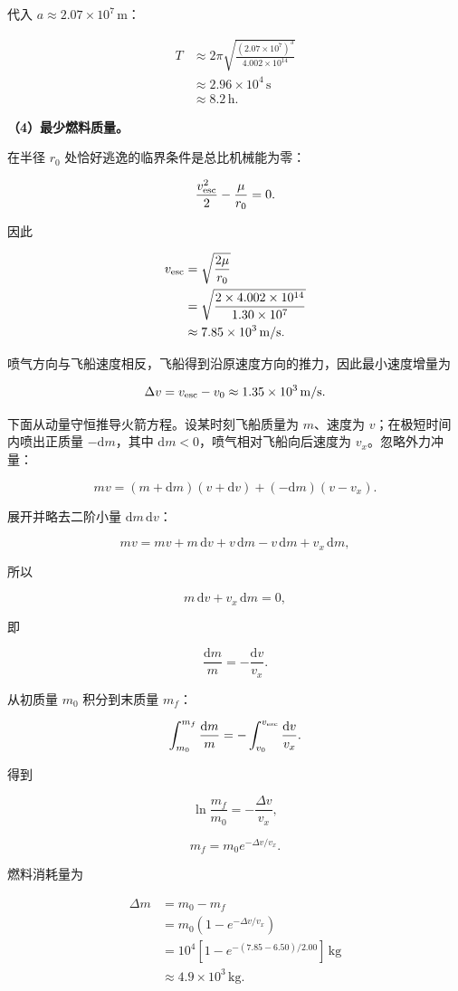 \documentclass[12pt,a4paper,UTF8]{ctexart}
\begin{document}
代入 \(a\approx2.07\times10^7\,\mathrm m\)：

\[
\begin{aligned}
T&\approx2\pi\sqrt{\frac{(2.07\times10^7)^3}{4.002\times10^{14}}}\\
&\approx2.96\times10^4\,\mathrm s\\
&\approx\boxed{8.2\,\mathrm h}.
\end{aligned}
\]

\textbf{（4）最少燃料质量。}

在半径 \(r_0\) 处恰好逃逸的临界条件是总比机械能为零：

\[\frac{v_{\rm esc}^2}{2}-\frac\mu{r_0}=0.\]

因此

\[
\begin{aligned}
v_{\rm esc}&=\sqrt{\frac{2\mu}{r_0}}\\
&=\sqrt{\frac{2\times4.002\times10^{14}}{1.30\times10^7}}\\
&\approx7.85\times10^3\,\mathrm{m/s}.
\end{aligned}
\]

喷气方向与飞船速度相反，飞船得到沿原速度方向的推力，因此最小速度增量为

\[\Delta v=v_{\rm esc}-v_0\approx1.35\times10^3\,\mathrm{m/s}.\]

下面从动量守恒推导火箭方程。设某时刻飞船质量为 \(m\)、速度为
\(v\)；在极短时间内喷出正质量 \(-\mathrm dm\)，其中
\(\mathrm dm<0\)，喷气相对飞船向后速度为 \(v_x\)。忽略外力冲量：

\[mv=(m+\mathrm dm)(v+\mathrm dv)+(-\mathrm dm)(v-v_x).\]

展开并略去二阶小量 \(\mathrm dm\,\mathrm dv\)：

\[mv=mv+m\,\mathrm dv+v\,\mathrm dm-v\,\mathrm dm+v_x\,\mathrm dm,\]

所以

\[m\,\mathrm dv+v_x\,\mathrm dm=0,\]

即

\[\frac{\mathrm dm}{m}=-\frac{\mathrm dv}{v_x}.\]

从初质量 \(m_0\) 积分到末质量 \(m_f\)：

\[\int_{m_0}^{m_f}\frac{\mathrm dm}{m}
=-\int_{v_0}^{v_{\rm esc}}\frac{\mathrm dv}{v_x}.\]

得到

\[\ln\frac{m_f}{m_0}=-\frac{\Delta v}{v_x},\]

\[m_f=m_0e^{-\Delta v/v_x}.\]

燃料消耗量为

\[
\begin{aligned}
\Delta m
&=m_0-m_f\\
&=m_0\left(1-e^{-\Delta v/v_x}\right)\\
&=10^4\left[1-e^{-(7.85-6.50)/2.00}\right]\,\mathrm{kg}\\
&\approx\boxed{4.9\times10^3\,\mathrm{kg}}.
\end{aligned}
\]
\end{document}

